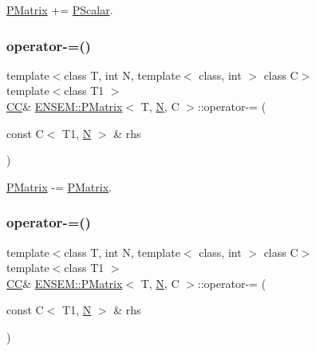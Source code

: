 \mbox{\hyperlink{classENSEM_1_1PMatrix}{P\+Matrix}} += \mbox{\hyperlink{classENSEM_1_1PScalar}{P\+Scalar}}. 

\mbox{\label{classENSEM_1_1PMatrix_a76fa178c64fa75b73925016654a08766}} 
\subsubsection{\texorpdfstring{operator-\/=()}{operator-=()}\hspace{0.1cm}{\footnotesize\ttfamily [1/4]}}
{\footnotesize\ttfamily template$<$class T, int N, template$<$ class, int $>$ class C$>$ \\
template$<$class T1 $>$ \\
\mbox{\hyperlink{classENSEM_1_1PMatrix_a744bac549029029effe32dc1705660ec}{CC}}\& \mbox{\hyperlink{classENSEM_1_1PMatrix}{E\+N\+S\+E\+M\+::\+P\+Matrix}}$<$ T, \mbox{\hyperlink{operator__name__util_8cc_a7722c8ecbb62d99aee7ce68b1752f337}{N}}, C $>$\+::operator-\/= (\begin{DoxyParamCaption}\item[{const C$<$ T1, \mbox{\hyperlink{operator__name__util_8cc_a7722c8ecbb62d99aee7ce68b1752f337}{N}} $>$ \&}]{rhs }\end{DoxyParamCaption})\hspace{0.3cm}{\ttfamily [inline]}}



\mbox{\hyperlink{classENSEM_1_1PMatrix}{P\+Matrix}} -\/= \mbox{\hyperlink{classENSEM_1_1PMatrix}{P\+Matrix}}. 

\mbox{\label{classENSEM_1_1PMatrix_a76fa178c64fa75b73925016654a08766}} 
\subsubsection{\texorpdfstring{operator-\/=()}{operator-=()}\hspace{0.1cm}{\footnotesize\ttfamily [2/4]}}
{\footnotesize\ttfamily template$<$class T, int N, template$<$ class, int $>$ class C$>$ \\
template$<$class T1 $>$ \\
\mbox{\hyperlink{classENSEM_1_1PMatrix_a744bac549029029effe32dc1705660ec}{CC}}\& \mbox{\hyperlink{classENSEM_1_1PMatrix}{E\+N\+S\+E\+M\+::\+P\+Matrix}}$<$ T, \mbox{\hyperlink{operator__name__util_8cc_a7722c8ecbb62d99aee7ce68b1752f337}{N}}, C $>$\+::operator-\/= (\begin{DoxyParamCaption}\item[{const C$<$ T1, \mbox{\hyperlink{operator__name__util_8cc_a7722c8ecbb62d99aee7ce68b1752f337}{N}} $>$ \&}]{rhs }\end{DoxyParamCaption})\hspace{0.3cm}{\ttfamily [inline]}}



